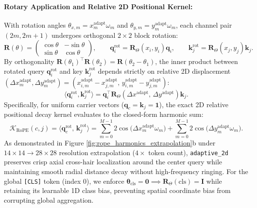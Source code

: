 \documentclass[11pt,a4paper]{article}
\begin{document}
\paragraph{Rotary Application and Relative 2D Positional Kernel:} With rotation angles $\theta_{x, m} = x_m^{\text{adapt}} \omega_m$ and $\theta_{y, m} = y_m^{\text{adapt}} \omega_m$, each channel pair $(2m, 2m+1)$ undergoes orthogonal $2\times 2$ block rotation:
\begin{equation}
\mathbf{R}(\theta) = \begin{pmatrix} \cos \theta & -\sin \theta \\ \sin \theta & \cos \theta \end{pmatrix}, \qquad \mathbf{q}_i^{\text{rot}} = \mathbf{R}_{\Theta}(x_i, y_i) \mathbf{q}_i, \qquad \mathbf{k}_j^{\text{rot}} = \mathbf{R}_{\Theta}(x_j, y_j) \mathbf{k}_j.
\label{eq:rot_matrix}
\end{equation}
By orthogonality $\mathbf{R}(\theta_1)^\top \mathbf{R}(\theta_2) = \mathbf{R}(\theta_2 - \theta_1)$, the inner product between rotated query $\mathbf{q}_i^{\text{rot}}$ and key $\mathbf{k}_j^{\text{rot}}$ depends strictly on relative 2D displacement $(\Delta x_m^{\text{adapt}}, \Delta y_m^{\text{adapt}}) = (x_{i,m}^{\text{adapt}} - x_{j,m}^{\text{adapt}}, \, y_{i,m}^{\text{adapt}} - y_{j,m}^{\text{adapt}})$:
\begin{equation}
\langle \mathbf{q}_i^{\text{rot}}, \mathbf{k}_j^{\text{rot}} \rangle = \mathbf{q}_i^\top \mathbf{R}_{\Theta}(\Delta x^{\text{adapt}}, \, \Delta y^{\text{adapt}}) \mathbf{k}_j.
\label{eq:inner_product_equivariance}
\end{equation}
Specifically, for uniform carrier vectors ($\mathbf{q}_c = \mathbf{k}_j = \mathbf{1}$), the exact 2D relative positional decay kernel evaluates to the closed-form harmonic sum:
\begin{equation}
\mathcal{K}_{\text{RoPE}}(c, j) = \langle \mathbf{q}_c^{\text{rot}}, \, \mathbf{k}_j^{\text{rot}} \rangle = \sum_{m=0}^{M-1} 2\cos\!\big(\Delta x_m^{\text{adapt}} \omega_m\big) + \sum_{m=0}^{M-1} 2\cos\!\big(\Delta y_m^{\text{adapt}} \omega_m\big).
\label{eq:rope_kernel}
\end{equation}
As demonstrated in Figure \ref{fig:rope_harmonics_extrapolation}b under $14\times 14 \to 28\times 28$ resolution extrapolation ($4\times$ token count), \texttt{adaptive\_2d} preserves crisp axial cross-hair localization around the center query while maintaining smooth radial distance decay without high-frequency ringing. For the global \texttt{[CLS]} token (index 0), we enforce $\boldsymbol{\theta}_{\text{cls}} = \mathbf{0} \implies \mathbf{R}_{\Theta}(\text{cls}) = \mathbf{I}$ while retaining its learnable 1D class bias, preventing spatial coordinate bias from corrupting global aggregation.
\end{document}

